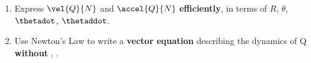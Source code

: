 %

\begin{enumerate}
\setlength{\itemsep}{0.25pc}
%
\item Express $\vel{Q}{N}$ and $\accel{Q}{N}$ \textbf{efficiently},
      in terms of $R$, $\theta$, $\thetadot$, $\thetaddot$.
\vspace{2.5in}

\item  Use Newton's Law to write a \textbf{vector equation} describing the dynamics of Q \textbf{without} \thetadot, \thetaddot.

		\vspace{1.4in}


\end{enumerate}
